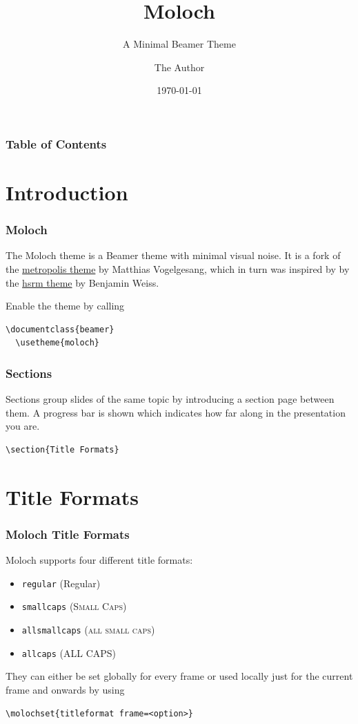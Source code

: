 \documentclass[10pt]{beamer}
\title{Moloch}
\subtitle{A Minimal Beamer Theme}
\date{\today}
\author{The Author}
\institute{Some Institution, Some University}
\begin{document}
\UBCTitlePage[variant=light]

\begin{frame}
  \frametitle{Table of Contents}
  \tableofcontents
\end{frame}

\section{Introduction}

\begin{frame}[fragile]
  \frametitle{Moloch}

  The Moloch theme is a Beamer theme with minimal visual noise. It is
  a fork of the
  \href{https://github.com/matze/mtheme}{metropolis theme} by
  Matthias Vogelgesang, which in
  turn was inspired by by the
  \href{https://github.com/hsrmbeamertheme/hsrmbeamertheme}{hsrm
  theme} by Benjamin Weiss. \medskip

  Enable the theme by calling
  \begin{verbatim}\documentclass{beamer}
  \usetheme{moloch}
  \end{verbatim}
\end{frame}
\begin{frame}[fragile]
  \frametitle{Sections}
  Sections group slides of the same topic by introducing a section
  page between them. A progress bar is shown which indicates how far
  along in the presentation you are.

  \begin{verbatim}\section{Title Formats}
  \end{verbatim}
\end{frame}

\section{Title Formats}

\begin{frame}[fragile]
  \frametitle{Moloch Title Formats}
  Moloch supports four different title formats:
  \begin{itemize}
    \item \texttt{regular} (Regular)
    \item \texttt{smallcaps} (\textsc{Small Caps})
    \item \texttt{allsmallcaps} (\textsc{all small caps})
    \item \texttt{allcaps} (ALL CAPS)
  \end{itemize}

  They can either be set globally for every frame or used locally
  just for the current frame
  and onwards by using
  \begin{verbatim}\molochset{titleformat frame=<option>}
  \end{verbatim}
\end{frame}
\end{document}
